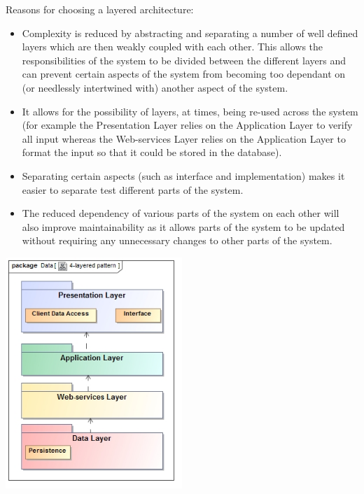 \documentclass[hidelinks,a4paper,12pt]{article}
\begin{document}
\begin{enumerate}
		Reasons for choosing a layered architecture:
		\begin{itemize}
			\item Complexity is reduced by abstracting and separating a number of well defined layers which are then weakly coupled with each other. This allows the responsibilities of the system to be divided between the different layers and can prevent certain aspects of the system from becoming too dependant on (or needlessly intertwined with) another aspect of the system.
			\item It allows for the possibility of layers, at times, being re-used across the system (for example the Presentation Layer relies on the Application Layer to verify all input whereas the Web-services Layer relies on the Application Layer to format the input so that it could be stored in the database).
			\item Separating certain aspects (such as interface and implementation) makes it easier to separate test different parts of the system.
			\item The reduced dependency of various parts of the system on each other will also improve maintainability as it allows parts of the system to be updated without requiring any unnecessary changes to other parts of the system.
		\end{itemize}
		\begin{center}
  	 		\includegraphics[width=0.5\textwidth] {./4-layered-pattern.jpg}\\[0.4cm]
		\end{center}
	\end{enumerate}

\newpage
\end{document}
